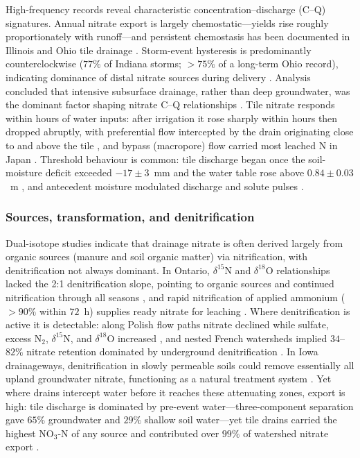 High-frequency records reveal characteristic concentration--discharge (C--Q)
signatures. Annual nitrate export is largely chemostatic---yields rise
roughly proportionately with runoff---and persistent chemostasis has been
documented in Illinois and Ohio tile drainage
\parencite{Speir2021,Hu2024,Williams2015}. Storm-event hysteresis is
predominantly counterclockwise ($77\%$ of Indiana storms; $>75\%$ of a
long-term Ohio record), indicating dominance of distal nitrate sources during
delivery \parencite{Speir2021,Liu2022b}. Analysis concluded that intensive
subsurface drainage, rather than deep groundwater, was the dominant factor
shaping nitrate C--Q relationships \parencite{Liu2022b}. Tile nitrate responds
within hours of water inputs: after irrigation it rose sharply within hours
then dropped abruptly, with preferential flow intercepted by the drain
originating close to and above the tile \parencite{Mohanty1998}, and bypass
(macropore) flow carried most leached N in Japan \parencite{Hayashi1999}.
Threshold behaviour is common: tile discharge began once the soil-moisture
deficit exceeded $-17\pm3$~mm and the water table rose above $0.84\pm0.03$~m
\parencite{Williams2022}, and antecedent moisture modulated discharge and
solute pulses \parencite{Trentman2020,Kennedy2012}.

\subsubsection{Sources, transformation, and denitrification}

Dual-isotope studies indicate that drainage nitrate is often derived largely
from organic sources (manure and soil organic matter) via nitrification, with
denitrification not always dominant. In Ontario, $\delta^{15}$N and
$\delta^{18}$O relationships lacked the 2:1 denitrification slope, pointing to
organic sources and continued nitrification through all seasons
\parencite{Smith2011,Smith2011b}, and rapid nitrification of applied ammonium
($>90\%$ within $72$~h) supplies ready nitrate for leaching \parencite{Hu2024}.
Where denitrification is active it is detectable: along Polish flow paths
nitrate declined while sulfate, excess N$_2$, $\delta^{15}$N, and
$\delta^{18}$O increased \parencite{Dragon2016}, and nested French watersheds
implied $34$--$82\%$ nitrate retention dominated by underground denitrification
\parencite{Billy2011,Billy2013}. In Iowa drainageways, denitrification in
slowly permeable soils could remove essentially all upland groundwater nitrate,
functioning as a natural treatment system
\parencite{Schilling2007,Cambardella1999}. Yet where drains intercept water
before it reaches these attenuating zones, export is high: tile discharge is
dominated by pre-event water---three-component separation gave $65\%$
groundwater and $29\%$ shallow soil water---yet tile drains carried the highest
NO$_3$-N of any source and contributed over $99\%$ of watershed nitrate export
\parencite{Williams2022,Grose2022}.